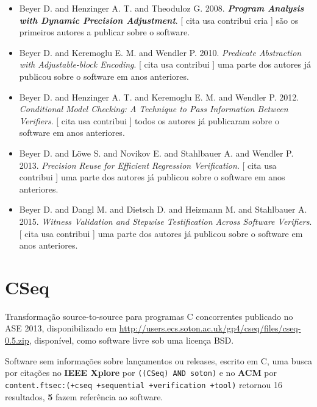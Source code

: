 \begin{itemize}
\item Beyer D. and Henzinger A. T. and Theoduloz G.
      2008.
        \textbf{\textit{ Program Analysis with Dynamic Precision Adjustment}}.
      [
          cita
          usa
          contribui
          cria
      ]
são os primeiros autores a publicar sobre o software.
\item Beyer D. and Keremoglu E. M. and Wendler P.
      2010.
        \textit{ Predicate Abstraction with Adjustable-block Encoding}.
      [
          cita
          usa
          contribui
      ]
uma parte dos autores já publicou sobre o software em anos anteriores.
\item Beyer D. and Henzinger A. T. and Keremoglu E. M. and Wendler P.
      2012.
        \textit{ Conditional Model Checking: A Technique to Pass Information Between Verifiers}.
      [
          cita
          usa
          contribui
      ]
todos os autores já publicaram sobre o software em anos anteriores.
\item Beyer D. and L\"{o}we S. and Novikov E. and Stahlbauer A. and Wendler P.
      2013.
        \textit{ Precision Reuse for Efficient Regression Verification}.
      [
          cita
          usa
          contribui
      ]
uma parte dos autores já publicou sobre o software em anos anteriores.
\item Beyer D. and Dangl M. and Dietsch D. and Heizmann M. and Stahlbauer A.
      2015.
        \textit{ Witness Validation and Stepwise Testification Across Software Verifiers}.
      [
          cita
          usa
          contribui
      ]
uma parte dos autores já publicou sobre o software em anos anteriores.
\end{itemize}
\section{CSeq}

Transformação source-to-source para programas C concorrentes
publicado no ASE 2013,
disponibilizado em \url{http://users.ecs.soton.ac.uk/gp4/cseq/files/cseq-0.5.zip},
disponível,
como software livre
sob uma licença BSD.

Software sem informações sobre lançamentos ou releases,
escrito em C,
uma busca por citações no {\bf IEEE Xplore} por
\texttt{((CSeq) AND soton)}
e no {\bf ACM} por
\texttt{content.ftsec:(+cseq +sequential +verification +tool)}
retornou
16 resultados,
{\bf 5} fazem referência ao software.


